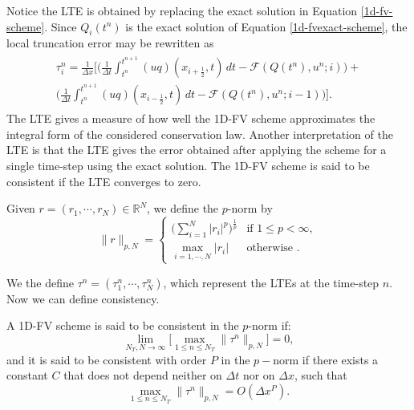 Notice the LTE is obtained by replacing the exact solution in Equation \eqref{1d-fv-scheme}.
Since $Q_i(t^n)$ is the exact solution of Equation \eqref{1d-fvexact-scheme}, 
the local truncation error may be rewritten as
\begin{align}
	\begin{split}
	\label{consistency-1d-eq2}
		\tau_{i}^n = 
		\frac{1}{\Delta x} \bigg[  \bigg( \frac{1}{\Delta t}\int_{t^{n}}^{t^{n+1}}
		{(uq)}(x_{i+\frac{1}{2}}, t) \,dt - \mathcal{F}(Q(t^n),u^n;i) \bigg) +\\
		\bigg( \frac{1}{\Delta t}\int_{t^{n}}^{t^{n+1}}
		{(uq)}(x_{i-\frac{1}{2}}, t) \,dt - \mathcal{F}(Q(t^n),u^n;i-1) \bigg)
		\bigg].
	\end{split}
\end{align}
The LTE gives a measure of how well the 1D-FV scheme approximates the integral form
of the considered conservation law. 
Another interpretation of the LTE is that the LTE gives the error obtained after applying
the scheme for a single time-step using the exact solution.
The 1D-FV scheme is said to be consistent
if the LTE converges to zero.

Given $r = (r_1, \cdots, r_N) \in \mathbb{R}^N$, we define the $p$-norm by
\begin{equation*}
	\label{chp2-pnorm}
	\|r\|_{p,N}=
	\begin{cases}
		\bigg( \sum_{i=1}^{N} |r_i|^p \bigg)^{\frac{1}{p}} & \text{if } 1\leq p < \infty,\\
		\max_{i=1, \cdots, N}{|r_i|} & \text{otherwise }.
	\end{cases}
\end{equation*}

We the define $\tau^n = (\tau_1^n, \cdots, \tau^n_N)$, which represent the LTEs at the time-step $n$.
Now we can define consistency.
\begin{definition}
	A 1D-FV scheme is said to be consistent in the $p$-norm if:
	\begin{equation*}
		\lim_{N_T, N \to \infty}\bigg[ {\max_{1\leq n\leq N_T}}{\|\tau^n\|_{p,N}} \bigg] = 0,
	\end{equation*}
	and it is said to be consistent with order $P$ in the $p-$norm if there exists a constant 
	$C$ that does not depend neither on $\Delta t$ nor on $\Delta x$, such that
	\begin{equation*}
		{\max_{1\leq n\leq N_T}}{\|\tau^n\|_{p,N}} = O(\Delta x^P).
	\end{equation*}
\end{definition}

